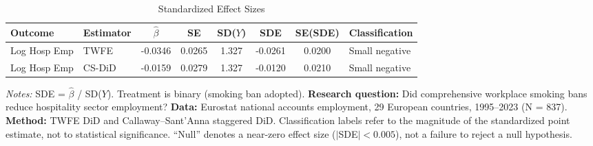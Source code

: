 \begin{table}[H]
\centering
\caption{Standardized Effect Sizes}
\label{tab:sde}
\small
\begin{tabular}{llcccccl}
\toprule
Outcome & Estimator & $\hat{\beta}$ & SE & SD($Y$) & SDE & SE(SDE) & Classification \\
\midrule
Log Hosp Emp & TWFE & -0.0346 & 0.0265 & 1.327 & -0.0261 & 0.0200 & Small negative \\
Log Hosp Emp & CS-DiD & -0.0159 & 0.0279 & 1.327 & -0.0120 & 0.0210 & Small negative \\
\bottomrule
\end{tabular}
\par\vspace{0.3em}
{\footnotesize \emph{Notes:} SDE = $\hat{\beta}$ / SD($Y$). Treatment is binary (smoking ban adopted). \textbf{Research question:} Did comprehensive workplace smoking bans reduce hospitality sector employment? \textbf{Data:} Eurostat national accounts employment, 29 European countries, 1995--2023 (N = 837). \textbf{Method:} TWFE DiD and Callaway--Sant'Anna staggered DiD. Classification labels refer to the magnitude of the standardized point estimate, not to statistical significance. ``Null'' denotes a near-zero effect size ($|$SDE$| < 0.005$), not a failure to reject a null hypothesis.}
\end{table}
